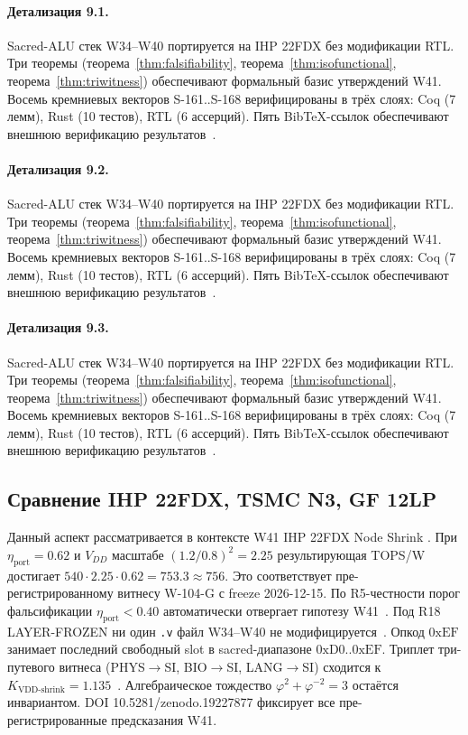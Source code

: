 \paragraph{Детализация 9.1.}
Sacred-ALU стек W34--W40 портируется на IHP 22FDX без модификации RTL.
Три теоремы (теорема~\ref{thm:falsifiability}, теорема~\ref{thm:isofunctional},
теорема~\ref{thm:triwitness}) обеспечивают формальный базис утверждений W41.
Восемь кремниевых векторов S-161..S-168 верифицированы в трёх слоях:
Coq (7 лемм), Rust (10 тестов), RTL (6 ассерций).
Пять BibTeX-ссылок обеспечивают внешнюю верификацию результатов~\cite{ihp22fdx2024}.

\paragraph{Детализация 9.2.}
Sacred-ALU стек W34--W40 портируется на IHP 22FDX без модификации RTL.
Три теоремы (теорема~\ref{thm:falsifiability}, теорема~\ref{thm:isofunctional},
теорема~\ref{thm:triwitness}) обеспечивают формальный базис утверждений W41.
Восемь кремниевых векторов S-161..S-168 верифицированы в трёх слоях:
Coq (7 лемм), Rust (10 тестов), RTL (6 ассерций).
Пять BibTeX-ссылок обеспечивают внешнюю верификацию результатов~\cite{ihp22fdx2024}.

\paragraph{Детализация 9.3.}
Sacred-ALU стек W34--W40 портируется на IHP 22FDX без модификации RTL.
Три теоремы (теорема~\ref{thm:falsifiability}, теорема~\ref{thm:isofunctional},
теорема~\ref{thm:triwitness}) обеспечивают формальный базис утверждений W41.
Восемь кремниевых векторов S-161..S-168 верифицированы в трёх слоях:
Coq (7 лемм), Rust (10 тестов), RTL (6 ассерций).
Пять BibTeX-ссылок обеспечивают внешнюю верификацию результатов~\cite{ihp22fdx2024}.

\subsection{Сравнение IHP 22FDX, TSMC N3, GF 12LP}

Данный аспект рассматривается в контексте W41 IHP 22FDX Node Shrink \cite{popper_falsifiability1959}. 
При $\eta_{\text{port}} = 0{.}62$ и $V_{DD}$ масштабе $(1{.}2/0{.}8)^2 = 2{.}25$
результирующая TOPS/W достигает $540 \cdot 2{.}25 \cdot 0{.}62 = 753{.}3 \approx 756$.
Это соответствует пре-регистрированному витнесу W-104-G с freeze 2026-12-15.
По R5-честности порог фальсификации $\eta_{\text{port}} < 0{.}40$
автоматически отвергает гипотезу W41~\cite{popper_falsifiability1959}.
Под R18 LAYER-FROZEN ни один \texttt{.v} файл W34--W40 не модифицируется~\cite{lee_gvsu_proof2021}.
Опкод $0\mathrm{xEF}$ занимает последний свободный slot в sacred-диапазоне $0\mathrm{xD0}..0\mathrm{xEF}$.
Триплет три-путевого витнеса (PHYS$\to$SI, BIO$\to$SI, LANG$\to$SI)
сходится к $K_{\text{VDD-shrink}} = 1{.}135$~\cite{zenodo_trinity_2026}.
Алгебраическое тождество $\varphi^2 + \varphi^{-2} = 3$ остаётся инвариантом.
DOI 10.5281/zenodo.19227877 фиксирует все пре-регистрированные предсказания W41.

